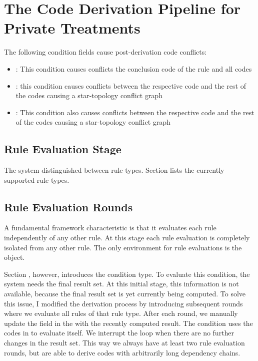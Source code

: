 \section{The Code Derivation Pipeline for Private Treatments}\label{sec:the-code-derivation-pipeline-for-private-treatments}

The following condition fields cause post-derivation code conflicts:
\begin{itemize}
    \item {}: This condition causes conflicts the conclusion code of the rule and all codes
    \item {}: this condition causes conflicts between the respective code and the rest of the codes causing a star-topology conflict graph
    \item {}: This condition also causes conflicts between the respective code and the rest of the codes causing a star-topology conflict graph
\end{itemize}

\subsection{Rule Evaluation Stage}\label{subsec:rule-evaluation-stage}

The system distinguished between rule types.
Section \addref lists the currently supported rule types.

\subsection{Rule Evaluation Rounds}\label{subsec:rule-evaluation-rounds}

A fundamental framework characteristic is that it evaluates each rule independently of any other rule.
At this stage each rule evaluation is completely isolated from any other rule.
The only  environment for rule evaluations is the \REI object.

Section \addref, however, introduces the  condition type.
To evaluate this condition, the system needs the final result set.
At this initial stage, this information is not available, because the final result set is yet currently being computed.
To solve this issue, I modified the derivation process by introducing subsequent rounds where we evaluate all rules of that rule type.
After each round, we manually update the  field in the \REI with the recently computed result.
The  condition uses the codes in  to evaluate itself.
We interrupt the loop when there are no further changes in the result set.
This way we always have at least two rule evaluation rounds, but are able to derive codes with arbitrarily long  dependency chains.

